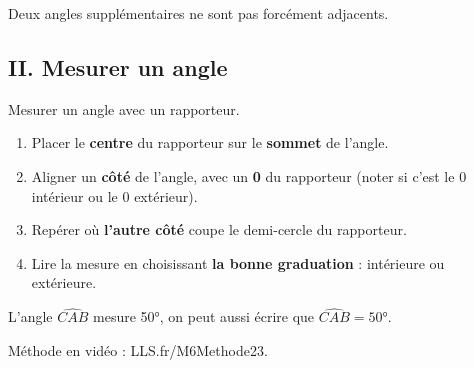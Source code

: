 \begin{Remarque}
\leavevmode\vspace{-\baselineskip}
Deux angles supplémentaires ne sont pas forcément adjacents.
\end{Remarque}
\vspace{0.5cm}



\subsection*{II. Mesurer un angle}


\begin{Méthode}[c] Mesurer un angle avec un rapporteur. \\
\begin{minipage}[t]{0.65\textwidth}
\vspace{0pt}
\begin{enumerate}[label=\textcolor{Couleur7}{\textbf{\arabic*.}}, leftmargin=*, itemsep=4pt]
    \item Placer le \textbf{centre} du rapporteur sur le \textbf{sommet} de l'angle.
    \item Aligner un \textbf{côté}  de l'angle, avec un \textbf{0} du rapporteur (noter si c'est le 0 intérieur ou le 0 extérieur).
    \item Repérer où \textbf{l'autre côté} coupe le demi-cercle du rapporteur.
    \item Lire la mesure en choisissant \textbf{la bonne graduation} : intérieure ou extérieure.
\end{enumerate}
\end{minipage}\hfill
\begin{minipage}[t]{0.3\textwidth}
\vspace{0pt}
\begin{center}
\end{center}


\end{minipage}
L'angle $\widehat{CAB}$ mesure 50°, on peut aussi écrire que $\widehat{CAB}=50$°.

\end{Méthode}

\begin{Remarque}
Méthode en vidéo : LLS.fr/M6Methode23.
\end{Remarque}



